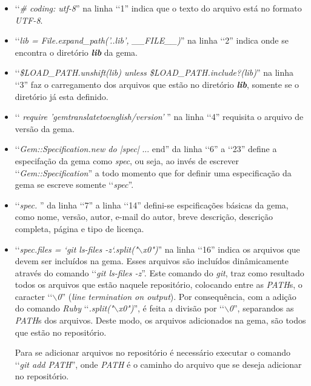 \begin{itemize}

 \item ‘‘\emph{\# coding: utf-8}'' na linha ‘‘1'' indica que o texto do arquivo está no formato \emph{UTF-8}.

 \item ‘‘\emph{lib = File.expand\_path('..\/lib', \_\_FILE\_\_)}'' na linha ‘‘2'' indica onde se encontra o
 diretório \emph{\textbf{lib}} da gema.

 \item ‘‘\emph{\$LOAD\_PATH.unshift(lib) unless \$LOAD\_PATH.include?(lib)}'' na linha ‘‘3'' faz o
 carregamento dos arquivos que estão no diretório \emph{\textbf{lib}}, somente se o diretório já
 esta definido.

 \item ‘‘ \emph{require 'gemtranslatetoenglish/version'} '' na linha ‘‘4'' requisita o arquivo de versão da
 gema.

 \item ‘‘\emph{Gem::Specification.new do |spec|} ... end'' da linha ‘‘6'' a ‘‘23'' define a especifação da
 gema como \emph{spec}, ou seja, ao invés de escrever ‘‘\emph{Gem::Specification}'' a todo momento que for
 definir uma especificação da gema se escreve somente ‘‘\emph{spec}''.

 \item ‘‘\emph{spec. }'' da linha ‘‘7'' a linha ‘‘14'' defini-se espcificações básicas da gema, como nome,
 versão, autor, e-mail do autor, breve descrição, descrição completa, página e tipo de licença.

 \item ‘‘\emph{spec.files = `git ls-files -z`.split("$\backslash$x0")}'' na linha ‘‘16'' indica os arquivos
 que devem ser incluídos na gema. Esses arquivos são incluídos dinâmicamente através do comando
 ‘‘\emph{git ls-files -z}''. Este comando do \emph{git}, traz como resultado todos os arquivos que estão
 naquele repositório, colocando entre as \emph{PATH}s, o caracter ‘‘\emph{$\backslash$0}''
 (\emph{line termination on output}). Por consequência, com a adição do comando \emph{Ruby}
 ‘‘\emph{.split("$\backslash$x0")}'', é feita a divisão por ‘‘\emph{$\backslash$0}'', separandos as
 \emph{PATH}s dos arquivos. Deste modo, os arquivos adicionados na gema, são todos que estão no repositório.

 Para se adicionar arquivos no repositório é necessário executar o comando ‘‘\emph{git add PATH}'',
 onde \emph{PATH} é o caminho do arquivo que se deseja adicionar no repositório.


\end{itemize}
